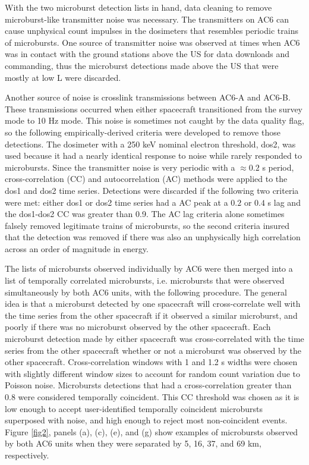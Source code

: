 With the two microburst detection lists in hand, data cleaning to remove microburst-like transmitter noise was necessary. The transmitters on AC6 can cause unphysical count impulses in the dosimeters that resembles periodic trains of microbursts. One source of transmitter noise was observed at times when AC6 was in contact with the ground stations above the US for data downloads and commanding, thus the microburst detections made above the US that were mostly at low L were discarded. 

Another source of noise is crosslink transmissions between AC6-A and AC6-B. These transmissions occurred when either spacecraft transitioned from the survey mode to 10 Hz mode. This noise is sometimes not caught by the data quality flag, so the following empirically-derived criteria were developed to remove those detections. The dosimeter with a 250 keV nominal electron threshold, dos2, was used because it had a nearly identical response to noise while rarely responded to microbursts. Since the transmitter noise is very periodic with a $\approx 0.2$ s period, cross-correlation (CC) and autocorrelation (AC) methods were applied to the dos1 and dos2 time series. Detections were discarded if the following two criteria were met: either dos1 or dos2 time series had a AC peak at a $0.2$ or $0.4$ s lag and the dos1-dos2 CC was greater than 0.9. The AC lag criteria alone sometimes falsely removed legitimate trains of microbursts, so the second criteria insured that the detection was removed if there was also an unphysically high correlation across an order of magnitude in energy.

The lists of microbursts observed individually by AC6 were then merged into a list of temporally correlated microbursts, i.e. microbursts that were observed simultaneously by both AC6 units, with the following procedure. The general idea is that a microburst detected by one spacecraft will cross-correlate well with the time series from the other spacecraft if it observed a similar microburst, and poorly if there was no microburst observed by the other spacecraft. Each microburst detection made by either spacecraft was cross-correlated with the time series from the other spacecraft whether or not a microburst was observed by the other spacecraft. Cross-correlation windows with 1 and 1.2 s widths were chosen with slightly different window sizes to account for random count variation due to Poisson noise. Microbursts detections that had a cross-correlation greater than $0.8$ were considered temporally coincident. This CC threshold was chosen as it is low enough to accept user-identified temporally coincident microbursts superposed with noise, and high enough to reject most non-coincident events. Figure \ref{fig2}, panels (a), (c), (e), and (g) show examples of microbursts observed by both AC6 units when they were separated by 5, 16, 37, and 69 km, respectively. 

